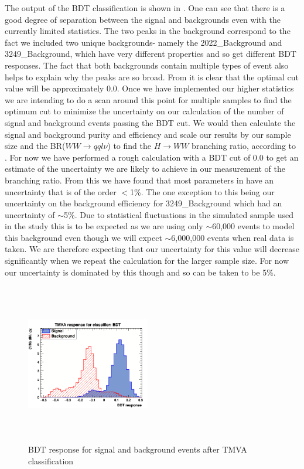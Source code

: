 The output of the BDT classification is shown in . One can see that there is a good degree of separation between the signal and backgrounds even with the currently limited statistics. The two peaks in the background correspond to the fact we included two unique backgrounds- namely the 2022\_Background and 3249\_Background, which have very different properties and so get different BDT responses. The fact that both backgrounds contain multiple types of event also helps to explain why the peaks are so broad. From  it is clear that the optimal cut value will be approximately 0.0. Once we have implemented our higher statistics we are intending to do a scan around this point for multiple samples to find the optimum cut to minimize the uncertainty on our calculation of the number of signal and background events passing the BDT cut. We would then calculate the signal and background purity and efficiency and scale our results by our sample size and the BR(${WW\rightarrow qql\nu}$)  to find the ${H\rightarrow WW}$ branching ratio, according to . For now we have performed a rough calculation with a BDT cut of 0.0 to get an estimate of the uncertainty we are likely to achieve in our measurement of the branching ratio. From this we have found that most parameters in  have an uncertainty that is of the order $<$1\%. The one exception to this being our uncertainty on the background efficiency for 3249\_Background which had an uncertainty of ${\sim}$5\%. Due to statistical fluctuations in the simulated sample used in the study this is to be expected as we are using only $\sim$60,000 events to model this background even though we will expect ${\sim}$6,000,000 events when real data is taken. We are therefore expecting that our uncertainty for this value will decrease significantly when we repeat the calculation for the larger sample size. For now our uncertainty is dominated by this though and so can be taken to be 5\%.

\begin{figure}
  \centering
  \includegraphics[width=0.48\textwidth,height=7cm,keepaspectratio]{fig/BDT}
  \caption[Classifier BDT response]{BDT response for signal and background events after TMVA classification}
  \label{Fig:BDT}
\end{figure}

